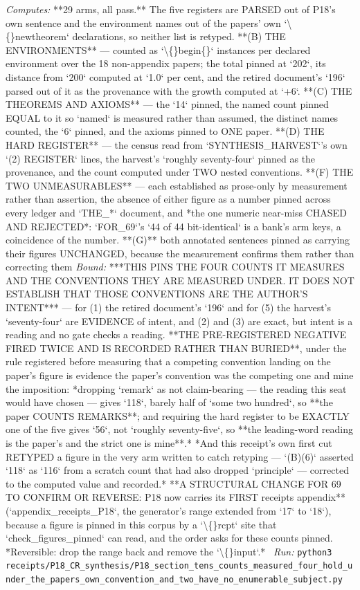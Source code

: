 \begin{description}
\emph{Computes:} **29 arms, all pass.** The five registers are PARSED out of P18's own sentence and the environment names out of the papers' own `\textbackslash\{\}newtheorem` declarations, so neither list is retyped. **(B) THE ENVIRONMENTS** --- counted as `\textbackslash\{\}begin\{\}` instances per declared environment over the 18 non-appendix papers; the total pinned at `202`, its distance from `200` computed at `1.0` per cent, and the retired document's `196` parsed out of it as the provenance with the growth computed at `+6`. **(C) THE THEOREMS AND AXIOMS** --- the `14` pinned, the named count pinned EQUAL to it so `named` is measured rather than assumed, the distinct names counted, the `6` pinned, and the axioms pinned to ONE paper. **(D) THE HARD REGISTER** --- the census read from `SYNTHESIS\_HARVEST`'s own `(2) REGISTER` lines, the harvest's `roughly seventy-four` pinned as the provenance, and the count computed under TWO nested conventions. **(F) THE TWO UNMEASURABLES** --- each established as prose-only by measurement rather than assertion, the absence of either figure as a number pinned across every ledger and `THE\_*` document, and *the one numeric near-miss CHASED AND REJECTED*: `FOR\_69`'s `44 of 44 bit-identical` is a bank's arm keys, a coincidence of the number. **(G)** both annotated sentences pinned as carrying their figures UNCHANGED, because the measurement confirms them rather than correcting them
 \emph{Bound:}  ***THIS PINS THE FOUR COUNTS IT MEASURES AND THE CONVENTIONS THEY ARE MEASURED UNDER. IT DOES NOT ESTABLISH THAT THOSE CONVENTIONS ARE THE AUTHOR'S INTENT*** --- for (1) the retired document's `196` and for (5) the harvest's `seventy-four` are EVIDENCE of intent, and (2) and (3) are exact, but intent is a reading and no gate checks a reading.  **THE PRE-REGISTERED NEGATIVE FIRED TWICE AND IS RECORDED RATHER THAN BURIED**, under the rule registered before measuring that a competing convention landing on the paper's figure is evidence the paper's convention was the competing one and mine the imposition: *dropping `remark` as not claim-bearing --- the reading this seat would have chosen --- gives `118`, barely half of `some two hundred`, so **the paper COUNTS REMARKS**; and requiring the hard register to be EXACTLY one of the five gives `56`, not `roughly seventy-five`, so **the leading-word reading is the paper's and the strict one is mine**.*  *And this receipt's own first cut RETYPED a figure in the very arm written to catch retyping --- `(B)(6)` asserted `118` as `116` from a scratch count that had also dropped `principle` --- corrected to the computed value and recorded.*  **A STRUCTURAL CHANGE FOR 69 TO CONFIRM OR REVERSE: P18 now carries its FIRST receipts appendix** (`appendix\_receipts\_P18`, the generator's range extended from `17` to `18`), because a figure is pinned in this corpus by a `\textbackslash\{\}rcpt` site that `check\_figures\_pinned` can read, and the order asks for these counts pinned. *Reversible: drop the range back and remove the `\textbackslash\{\}input`.*
\ \emph{Run:} \texttt{python3 receipts/P18\_CR\_synthesis/P18\_section\_tens\_counts\_measured\_four\_hold\_under\_the\_papers\_own\_convention\_and\_two\_have\_no\_enumerable\_subject.py}
\end{description}\endgroup
